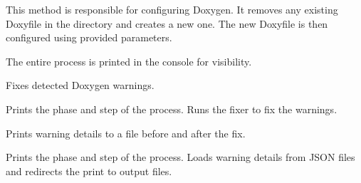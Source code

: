 \documentclass[letterpaper,10pt,english]{sphinxmanual}
\begin{document}
\begin{fulllineitems}
\begin{fulllineitems}
\sphinxAtStartPar
This method is responsible for configuring Doxygen.
It removes any existing Doxyfile in the directory and creates a new one.
The new Doxyfile is then configured using provided parameters.

\sphinxAtStartPar
The entire process is printed in the console for visibility.

\end{fulllineitems}


\begin{fulllineitems}
\label{\detokenize{main.ai_doxygen_cleaner:main.ai_doxygen_cleaner.ai_doxygen_cleaner.AIDoxygenCleaner.fix_doxygen_warning}}
\pysigstartsignatures
{}
\pysigstopsignatures
\sphinxAtStartPar
Fixes detected Doxygen warnings.

\sphinxAtStartPar
Prints the phase and step of the process.
Runs the fixer to fix the warnings.

\end{fulllineitems}


\begin{fulllineitems}
\label{\detokenize{main.ai_doxygen_cleaner:main.ai_doxygen_cleaner.ai_doxygen_cleaner.AIDoxygenCleaner.generate_html_diff_page}}
\pysigstartsignatures
{}
\pysigstopsignatures
\sphinxAtStartPar
Prints warning details to a file before and after the fix.

\sphinxAtStartPar
Prints the phase and step of the process.
Loads warning details from JSON files and redirects the print to output files.

\end{fulllineitems}



\end{fulllineitems}
\end{document}
